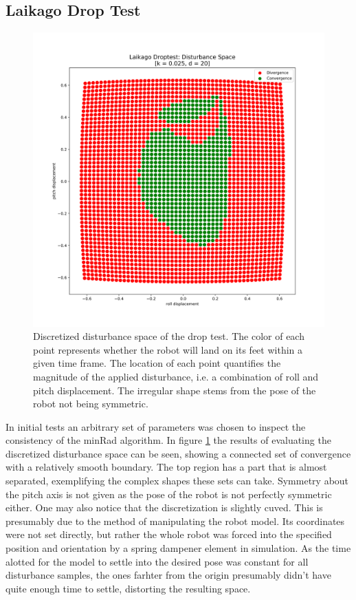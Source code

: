     \subsection{Laikago Drop Test}
    \begin{figure}[ht!]
    \centering
    \includegraphics[width=.7\linewidth]{figures/droptest_ds_v2.png}
    \caption[Discretized Disturbande Space, Drop Test]{Discretized disturbance space of the drop test. The color of each point represents whether the robot will land on its feet within a given time frame. The location of each point quantifies the magnitude of the applied disturbance, i.e. a combination of roll and pitch displacement. The irregular shape stems from the pose of the robot not being symmetric.}
    \label{fig:drop}
    \end{figure}    
    In initial tests an arbitrary set of parameters was chosen to inspect the consistency of the minRad algorithm. In figure \ref{fig:drop} the results of evaluating the discretized disturbance space can be seen, showing a connected set of convergence with a relatively smooth boundary. The top region has a part that is almost separated, exemplifying the complex shapes these sets can take. Symmetry about the pitch axis is not given as the pose of the robot is not perfectly symmetric either. One may also notice that the discretization is slightly cuved. This is presumably due to the method of manipulating the robot model. Its coordinates were not set directly, but rather the whole robot was forced into the specified position and orientation by a spring dampener element in simulation. As the time alotted for the model to settle into the desired pose was constant for all disturbance samples, the ones farhter from the origin presumably didn't have quite enough time to settle, distorting the resulting space.
    
